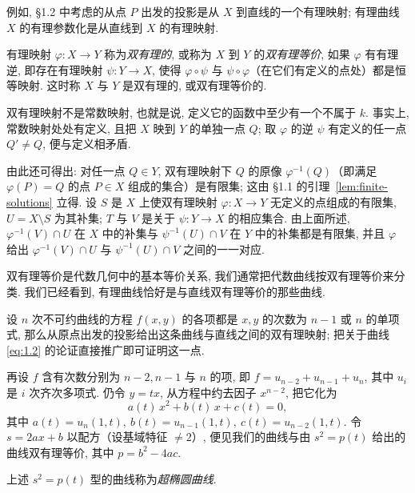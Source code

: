例如, §1.2 中考虑的从点 $P$ 出发的投影是从 $X$ 到直线的一个有理映射; 有理曲线 $X$ 的有理参数化是从直线到 $X$ 的有理映射.

\begin{definition}[双有理映射]\label{def:birational}
	有理映射 $\varphi: X \to Y$ 称为\emph{双有理的}, 或称为 $X$ 到 $Y$ 的\emph{双有理等价}, 如果 $\varphi$ 有有理逆, 即存在有理映射 $\psi: Y \to X$, 使得 $\varphi \circ \psi$ 与 $\psi \circ \varphi$（在它们有定义的点处）都是恒等映射. 这时称 $X$ 与 $Y$ 是双有理的, 或双有理等价的.
\end{definition}

双有理映射不是常数映射, 也就是说, 定义它的函数中至少有一个不属于 $k$. 事实上, 常数映射处处有定义, 且把 $X$ 映到 $Y$ 的单独一点 $Q$; 取 $\varphi$ 的逆 $\psi$ 有定义的任一点 $Q' \ne Q$, 便与定义相矛盾.

由此还可得出: 对任一点 $Q \in Y$, 双有理映射下 $Q$ 的原像 $\varphi^{-1}(Q)$（即满足 $\varphi(P) = Q$ 的点 $P \in X$ 组成的集合）是有限集; 这由 §1.1 的引理~\ref{lem:finite-solutions} 立得. 设 $S$ 是 $X$ 上使双有理映射 $\varphi: X \to Y$ 无定义的点组成的有限集, $U = X \setminus S$ 为其补集; $T$ 与 $V$ 是关于 $\psi: Y \to X$ 的相应集合. 由上面所述, $\varphi^{-1}(V) \cap U$ 在 $X$ 中的补集与 $\psi^{-1}(U) \cap V$ 在 $Y$ 中的补集都是有限集, 并且 $\varphi$ 给出 $\varphi^{-1}(V) \cap U$ 与 $\psi^{-1}(U) \cap V$ 之间的一一对应.

双有理等价是代数几何中的基本等价关系, 我们通常把代数曲线按双有理等价来分类. 我们已经看到, 有理曲线恰好是与直线双有理等价的那些曲线.

设 $n$ 次不可约曲线的方程 $f(x,y)$ 的各项都是 $x, y$ 的次数为 $n-1$ 或 $n$ 的单项式, 那么从原点出发的投影给出这条曲线与直线之间的双有理映射; 把关于曲线 \eqref{eq:1.2} 的论证直接推广即可证明这一点.

再设 $f$ 含有次数分别为 $n-2, n-1$ 与 $n$ 的项, 即 $f = u_{n-2} + u_{n-1} + u_n$, 其中 $u_i$ 是 $i$ 次齐次多项式. 仍令 $y = tx$, 从方程中约去因子 $x^{n-2}$, 把它化为
\[
	a(t)\, x^2 + b(t)\, x + c(t) = 0,
\]
其中 $a(t) = u_n(1,t),\ b(t) = u_{n-1}(1,t),\ c(t) = u_{n-2}(1,t)$. 令 $s = 2ax + b$ 以配方（设基域特征 $\ne 2$）, 便见我们的曲线与由 $s^2 = p(t)$ 给出的曲线双有理等价, 其中 $p = b^2 - 4ac$.

\begin{definition}[超椭圆曲线]\label{def:hyperelliptic}
	上述 $s^2 = p(t)$ 型的曲线称为\emph{超椭圆曲线}.
\end{definition}

